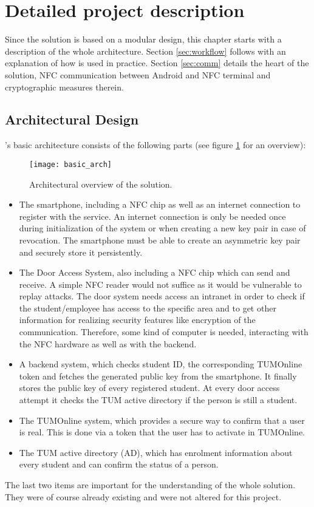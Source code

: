 \section{Detailed project description}

Since the \app solution is based on a modular design, this chapter starts with a description of the whole architecture.
Section \ref{sec:workflow} follows with an explanation of how \app is used in practice.
Section \ref{sec:comm} details the heart of the solution, NFC communication between Android and NFC terminal and cryptographic measures therein.

\subsection{Architectural Design}\label{sec:arch}


\app's basic architecture consists of the following parts (see figure \ref{fig:arch_ov} for an overview):

\begin{figure}
\centering
\texttt{[image: basic\_arch]}
\caption{Architectural overview of the \app solution.}
\label{fig:arch_ov}
\end{figure}


\begin{itemize}
\item The smartphone, including a NFC chip as well as an internet connection to register with the service.
An internet connection is only be needed once during initialization of the system or when creating a new key pair in case of revocation.
The smartphone must be able to create an asymmetric key pair and securely store it persistently.
\item The Door Access System, also including a NFC chip which can send and receive.
A simple NFC reader would not suffice as it would be vulnerable to replay attacks.
The door system needs access an intranet in order to check if the student/employee has access to the specific area and to get other information for realizing security features like encryption of the communication.
Therefore, some kind of computer is needed, interacting with the NFC hardware as well as with the backend.
\item A backend system, which checks student ID, the corresponding TUMOnline token and fetches the generated public key from the smartphone.
It finally stores the public key of every registered student.
At every door access attempt it checks the TUM active directory if the person is still a student.
\item The TUMOnline system, which provides a secure way to confirm that a user is real.
This is done via a token that the user has to activate in TUMOnline.
\item The TUM active directory (AD), which has enrolment information about every student and can confirm the status of a person.
\end{itemize} 
The last two items are important for the understanding of the whole solution. They were of course already existing and were not altered for this project.

